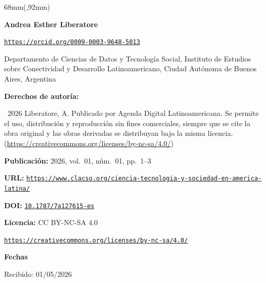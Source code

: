 \documentclass{article}
\newlength{\gbbloquex}
\begin{document}
\begin{textblock*}{68mm}(\gbbloquex,92mm)
{\setlength{\leftskip}{0pt}\setlength{\parindent}{0pt}%
\noindent\begin{minipage}[t]{68mm}
\sffamily\small\setlength{\parskip}{1pt}
{\bfseries\color{azulrevista}Andrea Esther Liberatore}\par
{\scriptsize\texttt{\href{https://orcid.org/0009-0003-9648-5013}{https://orcid.org/0009-0003-9648-5013}}}\par
Departamento de Ciencias de Datos y Tecnología Social, Instituto de Estudios sobre Conectividad y Desarrollo Latinoamericano, Ciudad Autónoma de Buenos Aires, Argentina\par
\vspace{6pt}
{\bfseries\color{azulrevista!70}Derechos de autor\'ia:}\par
\textcopyright\ 2026 Liberatore, A. Publicado por Agenda Digital Latinoamericana. Se permite el uso, distribución y reproducción sin fines comerciales, siempre que se cite la obra original y las obras derivadas se distribuyan bajo la misma licencia. (\href{https://creativecommons.org/licenses/by-nc-sa/4.0/}{https://creativecommons.org/licenses/by-nc-sa/4.0/})\par\vspace{6pt}
{\bfseries\color{azulrevista!70}Publicación:} 2026, vol.~01, n\'um.~01, pp.~1--3\par\vspace{6pt}
{\bfseries\color{azulrevista!70}URL:} {\scriptsize\texttt{\href{https://www.clacso.org/ciencia-tecnologia-y-sociedad-en-america-latina/}{https://www.clacso.org/ciencia-tecnologia-y-sociedad-en-america-latina/}}}\par\vspace{6pt}
{\bfseries\color{azulrevista!70}DOI:} {\scriptsize\texttt{\href{https://doi.org/10.1787/7a127615-es}{10.1787/7a127615-es}}}\par\vspace{6pt}
{\bfseries\color{azulrevista!70}Licencia:} CC BY-NC-SA 4.0\par
{\scriptsize\texttt{\href{https://creativecommons.org/licenses/by-nc-sa/4.0/}{https://creativecommons.org/licenses/by-nc-sa/4.0/}}}\par
\vspace{6pt}
{\bfseries\color{azulrevista!70}Fechas}\par\vspace{2pt}
Recibido: 01/05/2026\par

\end{minipage}}
\end{textblock*}
\end{document}
